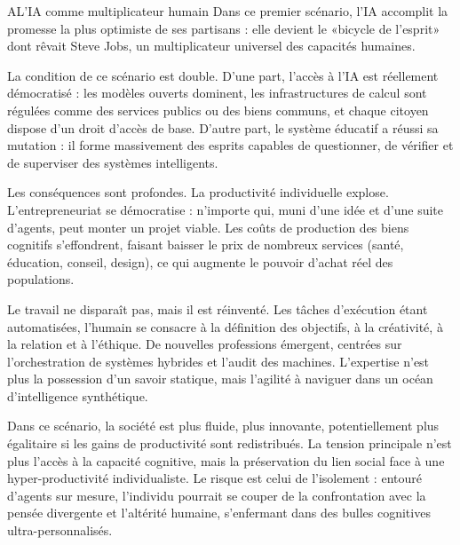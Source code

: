 \begin{scenariobox}{A}{L'IA comme multiplicateur humain}
Dans ce premier scénario, l'IA accomplit la promesse la plus optimiste de ses partisans : elle devient le «bicycle de l'esprit» dont rêvait Steve Jobs, un multiplicateur universel des capacités humaines.

La condition de ce scénario est double. D'une part, l'accès à l'IA est réellement démocratisé : les modèles ouverts dominent, les infrastructures de calcul sont régulées comme des services publics ou des biens communs, et chaque citoyen dispose d'un droit d'accès de base. D'autre part, le système éducatif a réussi sa mutation : il forme massivement des esprits capables de questionner, de vérifier et de superviser des systèmes intelligents.

Les conséquences sont profondes. La productivité individuelle explose. L'entrepreneuriat se démocratise : n'importe qui, muni d'une idée et d'une suite d'agents, peut monter un projet viable. Les coûts de production des biens cognitifs s'effondrent, faisant baisser le prix de nombreux services (santé, éducation, conseil, design), ce qui augmente le pouvoir d'achat réel des populations.

Le travail ne disparaît pas, mais il est réinventé. Les tâches d'exécution étant automatisées, l'humain se consacre à la définition des objectifs, à la créativité, à la relation et à l'éthique. De nouvelles professions émergent, centrées sur l'orchestration de systèmes hybrides et l'audit des machines. L'expertise n'est plus la possession d'un savoir statique, mais l'agilité à naviguer dans un océan d'intelligence synthétique.

Dans ce scénario, la société est plus fluide, plus innovante, potentiellement plus égalitaire si les gains de productivité sont redistribués. La tension principale n'est plus l'accès à la capacité cognitive, mais la préservation du lien social face à une hyper-productivité individualiste. Le risque est celui de l'isolement : entouré d'agents sur mesure, l'individu pourrait se couper de la confrontation avec la pensée divergente et l'altérité humaine, s'enfermant dans des bulles cognitives ultra-personnalisés.
\end{scenariobox}

